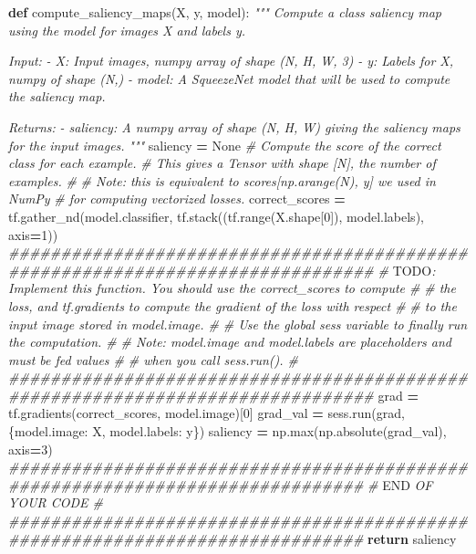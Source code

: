 \documentclass[]{book}
\newenvironment{Shaded}{\begin{snugshade}}{\end{snugshade}}
\newcommand{\KeywordTok}[1]{\textcolor[rgb]{0.13,0.29,0.53}{\textbf{#1}}}
\newcommand{\DecValTok}[1]{\textcolor[rgb]{0.00,0.00,0.81}{#1}}
\newcommand{\CommentTok}[1]{\textcolor[rgb]{0.56,0.35,0.01}{\textit{#1}}}
\newcommand{\VariableTok}[1]{\textcolor[rgb]{0.00,0.00,0.00}{#1}}
\newcommand{\ControlFlowTok}[1]{\textcolor[rgb]{0.13,0.29,0.53}{\textbf{#1}}}
\newcommand{\OperatorTok}[1]{\textcolor[rgb]{0.81,0.36,0.00}{\textbf{#1}}}
\newcommand{\BuiltInTok}[1]{#1}
\newcommand{\RegionMarkerTok}[1]{#1}
\newcommand{\AlertTok}[1]{\textcolor[rgb]{0.94,0.16,0.16}{#1}}
\newcommand{\NormalTok}[1]{#1}
\theoremstyle{definition}
\theoremstyle{definition}
\theoremstyle{definition}
\theoremstyle{remark}
\begin{document}
\begin{Shaded}
\begin{Highlighting}[]
\KeywordTok{def}\NormalTok{ compute_saliency_maps(X, y, model):}
    \CommentTok{"""}
\CommentTok{    Compute a class saliency map using the model for images X and labels y.}

\CommentTok{    Input:}
\CommentTok{    - X: Input images, numpy array of shape (N, H, W, 3)}
\CommentTok{    - y: Labels for X, numpy of shape (N,)}
\CommentTok{    - model: A SqueezeNet model that will be used to compute the saliency map.}

\CommentTok{    Returns:}
\CommentTok{    - saliency: A numpy array of shape (N, H, W) giving the saliency maps for the}
\CommentTok{    input images.}
\CommentTok{    """}
\NormalTok{    saliency }\OperatorTok{=} \VariableTok{None}
    \CommentTok{# Compute the score of the correct class for each example.}
    \CommentTok{# This gives a Tensor with shape [N], the number of examples.}
    \CommentTok{#}
    \CommentTok{# Note: this is equivalent to scores[np.arange(N), y] we used in NumPy}
    \CommentTok{# for computing vectorized losses.}
\NormalTok{    correct_scores }\OperatorTok{=}\NormalTok{ tf.gather_nd(model.classifier,}
\NormalTok{                                  tf.stack((tf.}\BuiltInTok{range}\NormalTok{(X.shape[}\DecValTok{0}\NormalTok{]), model.labels), axis}\OperatorTok{=}\DecValTok{1}\NormalTok{))}
    \CommentTok{###############################################################################}
    \CommentTok{# }\AlertTok{TODO}\CommentTok{: Implement this function. You should use the correct_scores to compute #}
    \CommentTok{# the loss, and tf.gradients to compute the gradient of the loss with respect #}
    \CommentTok{# to the input image stored in model.image.                                   #}
    \CommentTok{# Use the global sess variable to finally run the computation.                #}
    \CommentTok{# Note: model.image and model.labels are placeholders and must be fed values  #}
    \CommentTok{# when you call sess.run().                                                   #}
    \CommentTok{###############################################################################}
\NormalTok{    grad }\OperatorTok{=}\NormalTok{ tf.gradients(correct_scores, model.image)[}\DecValTok{0}\NormalTok{]}
\NormalTok{    grad_val }\OperatorTok{=}\NormalTok{ sess.run(grad, \{model.image: X, }
\NormalTok{                               model.labels: y\})}
\NormalTok{    saliency }\OperatorTok{=}\NormalTok{ np.}\BuiltInTok{max}\NormalTok{(np.absolute(grad_val), axis}\OperatorTok{=}\DecValTok{3}\NormalTok{)}
    \CommentTok{##############################################################################}
    \CommentTok{#                             }\RegionMarkerTok{END}\CommentTok{ OF YOUR CODE                               #}
    \CommentTok{##############################################################################}
    \ControlFlowTok{return}\NormalTok{ saliency}
\end{Highlighting}
\end{Shaded}
\end{document}
